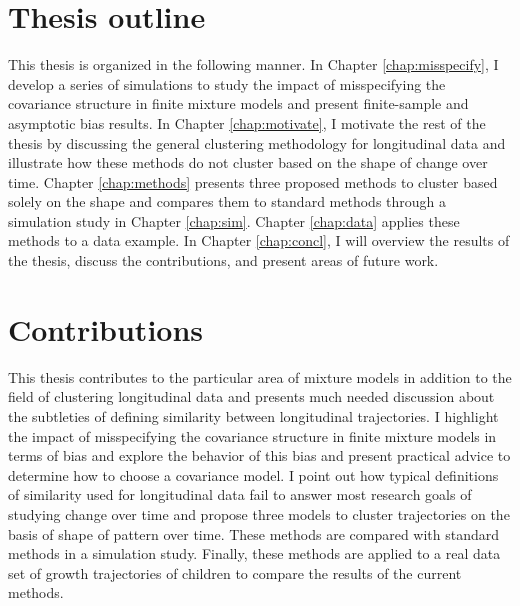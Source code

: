 \section{Thesis outline}
This thesis is organized in the following manner. In Chapter \ref{chap:misspecify}, I develop a series of simulations to study the impact of misspecifying the covariance structure in finite mixture models and present finite-sample and asymptotic bias results. In Chapter \ref{chap:motivate}, I motivate the rest of the thesis by discussing the general clustering methodology for longitudinal data and illustrate how these methods do not cluster based on the shape of change over time. Chapter \ref{chap:methods} presents three proposed methods to cluster based solely on the shape and compares them to standard methods through a simulation study in Chapter \ref{chap:sim}. Chapter \ref{chap:data} applies these methods to a data example. In Chapter \ref{chap:concl}, I will overview the results of the thesis, discuss the contributions, and present areas of future work. 

\section{Contributions}
This thesis contributes to the particular area of mixture models in addition to the field of clustering longitudinal data and presents much needed discussion about the subtleties of defining similarity between longitudinal trajectories. I highlight the impact of misspecifying the covariance structure in finite mixture models in terms of bias and explore the behavior of this bias and present practical advice to determine how to choose a covariance model. I point out how typical definitions of similarity used for longitudinal data fail to answer most research goals of studying change over time and propose three models to cluster trajectories on the basis of shape of pattern over time. These methods are compared with standard methods in a simulation study. Finally, these methods are applied to a real data set of growth trajectories of children to compare the results of the current methods. 
